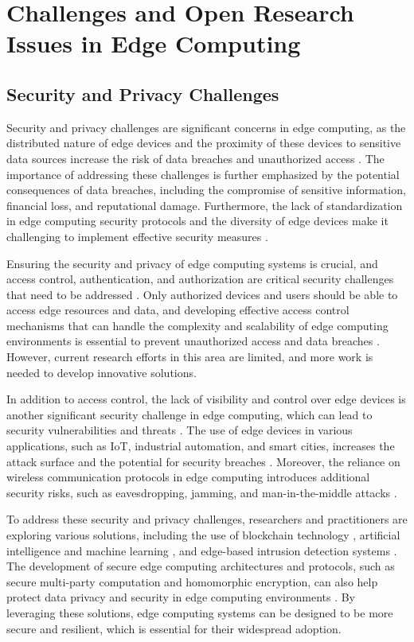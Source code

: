 \documentclass[11pt]{article}
\begin{document}
\section{Challenges and Open Research Issues in Edge Computing}

\subsection{Security and Privacy Challenges}

Security and privacy challenges are significant concerns in edge computing, as the distributed nature of edge devices and the proximity of these devices to sensitive data sources increase the risk of data breaches and unauthorized access \cite{ref53}. The importance of addressing these challenges is further emphasized by the potential consequences of data breaches, including the compromise of sensitive information, financial loss, and reputational damage. Furthermore, the lack of standardization in edge computing security protocols and the diversity of edge devices make it challenging to implement effective security measures \cite{ref61}.

Ensuring the security and privacy of edge computing systems is crucial, and access control, authentication, and authorization are critical security challenges that need to be addressed \cite{ref62}. Only authorized devices and users should be able to access edge resources and data, and developing effective access control mechanisms that can handle the complexity and scalability of edge computing environments is essential to prevent unauthorized access and data breaches \cite{ref63}. However, current research efforts in this area are limited, and more work is needed to develop innovative solutions.

In addition to access control, the lack of visibility and control over edge devices is another significant security challenge in edge computing, which can lead to security vulnerabilities and threats \cite{ref64}. The use of edge devices in various applications, such as IoT, industrial automation, and smart cities, increases the attack surface and the potential for security breaches \cite{ref65}. Moreover, the reliance on wireless communication protocols in edge computing introduces additional security risks, such as eavesdropping, jamming, and man-in-the-middle attacks \cite{ref66}.

To address these security and privacy challenges, researchers and practitioners are exploring various solutions, including the use of blockchain technology \cite{ref67}, artificial intelligence and machine learning \cite{ref68}, and edge-based intrusion detection systems \cite{ref69}. The development of secure edge computing architectures and protocols, such as secure multi-party computation and homomorphic encryption, can also help protect data privacy and security in edge computing environments \cite{ref70}. By leveraging these solutions, edge computing systems can be designed to be more secure and resilient, which is essential for their widespread adoption.
\end{document}
